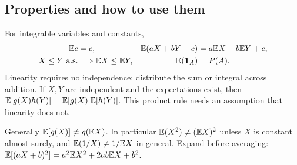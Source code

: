 \subsection{Properties and how to use them}
For integrable variables and constants,
\begin{align*}
\mathbb E c&=c,&\mathbb E(aX+bY+c)&=a\mathbb E X+b\mathbb E Y+c,\\
X\le Y\ \text{a.s.}&\Longrightarrow\mathbb E X\le\mathbb E Y,&\mathbb E(\mathbf1_A)&=P(A).
\end{align*}
Linearity requires no independence: distribute the sum or integral across addition. If $X,Y$ are independent and the expectations exist, then $\mathbb E[g(X)h(Y)]=\mathbb E[g(X)]\mathbb E[h(Y)]$. This product rule needs an assumption that linearity does not.
\begin{pitfall}[Nonlinearity]
Generally $\mathbb E[g(X)]\ne g(\mathbb E X)$. In particular $\mathbb E(X^2)\ne(\mathbb E X)^2$ unless $X$ is constant almost surely, and $\mathbb E(1/X)\ne1/\mathbb E X$ in general. Expand before averaging: $\mathbb E[(aX+b)^2]=a^2\mathbb E X^2+2ab\mathbb E X+b^2$.
\end{pitfall}
